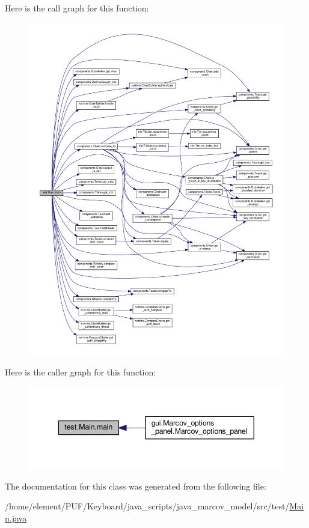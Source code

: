 Here is the call graph for this function\+:\nopagebreak
\begin{figure}[H]
\begin{center}
\leavevmode
\includegraphics[width=350pt]{classtest_1_1_main_a7204edbad3d2a9d9784c3fa9786326cc_cgraph}
\end{center}
\end{figure}




Here is the caller graph for this function\+:\nopagebreak
\begin{figure}[H]
\begin{center}
\leavevmode
\includegraphics[width=343pt]{classtest_1_1_main_a7204edbad3d2a9d9784c3fa9786326cc_icgraph}
\end{center}
\end{figure}




The documentation for this class was generated from the following file\+:\begin{DoxyCompactItemize}
\item 
/home/element/\+P\+U\+F/\+Keyboard/java\+\_\+scripts/java\+\_\+marcov\+\_\+model/src/test/\hyperlink{_main_8java}{Main.\+java}\end{DoxyCompactItemize}
